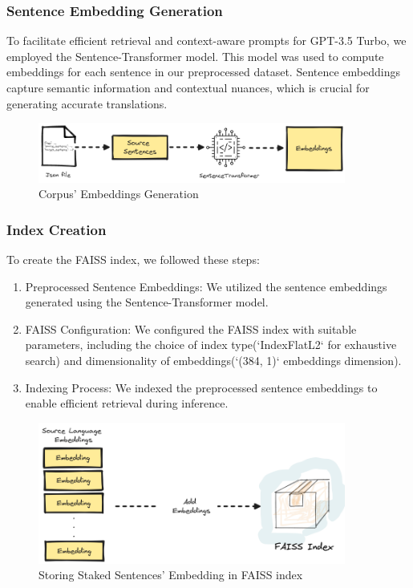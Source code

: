 \documentclass[12pt]{article}
\begin{document}
\subsubsection{Sentence Embedding Generation}
To facilitate efficient retrieval and context-aware prompts for GPT-3.5 Turbo, we employed the Sentence-Transformer model. This model was used to compute embeddings for each sentence in our preprocessed dataset. Sentence embeddings capture semantic information and contextual nuances, which is crucial for generating accurate translations.


\begin{figure}[h]
	\centering
	\includegraphics[width=0.9\textwidth]{assets/calculate_embeddings.png}
	\caption{Corpus' Embeddings Generation}
	\label{fig:embeddinggeneration}
\end{figure}


\subsubsection{Index Creation}

To create the FAISS index, we followed these steps:

\begin{enumerate}
	\item Preprocessed Sentence Embeddings: We utilized the sentence embeddings generated using the Sentence-Transformer model.
	\item FAISS Configuration: We configured the FAISS index with suitable parameters, including the choice of index type(`IndexFlatL2` for exhaustive search) and dimensionality of embeddings(`(384, 1)` embeddings dimension).
	\item Indexing Process: We indexed the preprocessed sentence embeddings to enable efficient retrieval during inference.
\end{enumerate}

\begin{figure}[h]
	\centering
	\includegraphics[width=0.9\textwidth]{assets/FAISS_index.png}
	\caption{Storing Staked Sentences' Embedding in FAISS index}
	\label{fig:embeddings}
\end{figure}
\end{document}
